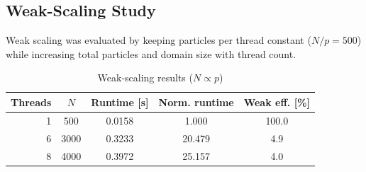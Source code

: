 \subsection{Weak-Scaling Study}
Weak scaling was evaluated by keeping particles per thread constant ($N/p=500$) while increasing total particles and domain size with thread count.
\begin{table}[!t]
\centering
\caption{Weak-scaling results ($N \propto p$)}
\label{tab:weak-scaling}
\begin{tabular}{rcccc}
\toprule
Threads & $N$ & Runtime [s] & Norm. runtime & Weak eff. [\%] \\
\midrule
1 & 500 & 0.0158 & 1.000 & 100.0 \\
6 & 3000 & 0.3233 & 20.479 & 4.9 \\
8 & 4000 & 0.3972 & 25.157 & 4.0 \\
\bottomrule
\end{tabular}
\end{table}
